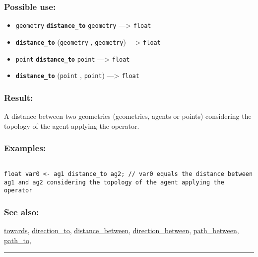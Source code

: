 \documentclass[]{book}
\providecommand{\tightlist}{%
  \setlength{\itemsep}{0pt}\setlength{\parskip}{0pt}}
\theoremstyle{definition}
\theoremstyle{definition}
\theoremstyle{definition}
\theoremstyle{remark}
\begin{document}
\subsubsection{Possible use:}\label{possible-use-136}

\begin{itemize}
\tightlist
\item
  \texttt{geometry} \textbf{\texttt{distance\_to}} \texttt{geometry}
  ---\textgreater{} \texttt{float}
\item
  \textbf{\texttt{distance\_to}} (\texttt{geometry} , \texttt{geometry})
  ---\textgreater{} \texttt{float}
\item
  \texttt{point} \textbf{\texttt{distance\_to}} \texttt{point}
  ---\textgreater{} \texttt{float}
\item
  \textbf{\texttt{distance\_to}} (\texttt{point} , \texttt{point})
  ---\textgreater{} \texttt{float}
\end{itemize}

\subsubsection{Result:}\label{result-132}

A distance between two geometries (geometries, agents or points)
considering the topology of the agent applying the operator.

\subsubsection{Examples:}\label{examples-103}

\begin{verbatim}
 
float var0 <- ag1 distance_to ag2; // var0 equals the distance between ag1 and ag2 considering the topology of the agent applying the operator
\end{verbatim}

\subsubsection{See also:}\label{see-also-81}

\href{OperatorsSZ\#towards}{towards},
\href{OperatorsDH\#direction_to}{direction\_to},
\href{OperatorsDH\#distance_between}{distance\_between},
\href{OperatorsDH\#direction_between}{direction\_between},
\href{OperatorsNR\#path_between}{path\_between},
\href{OperatorsNR\#path_to}{path\_to},

\begin{center}\rule{0.5\linewidth}{\linethickness}\end{center}
\end{document}
